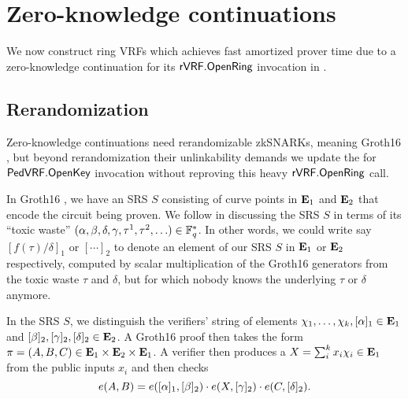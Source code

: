 
\section{Zero-knowledge continuations}
\label{sec:rvrf_cont}

We now construct ring VRFs which achieves fast amortized prover time
due to a zero-knowledge continuation for its ${\mathsf{rVRF}}.{\mathsf{OpenRing}}$
invocation in \Rring. 


\subsection{Rerandomization}

Zero-knowledge continuations need rerandomizable zkSNARKs,
meaning Groth16 \cite{Groth16}, but beyond rerandomization their
unlinkability demands we update the \openpk for ${\mathsf{PedVRF}}.{\mathsf{OpenKey}}$
invocation without reproving this heavy ${\mathsf{rVRF}}.{\mathsf{OpenRing}}$ call.

In Groth16 \cite{Groth16}, we have an SRS $S$ consisting of curve
points in ${\mathbf{E}}_1$ and ${\mathbf{E}}_2$ that encode the circuit being proven.
We follow \cite{Groth16} in discussing the SRS $S$ in terms of
its ``toxic waste''
 $(\alpha,\beta,\delta,\gamma,\tau^1,\tau^2,\ldots) \in \mathbb{F}_q^*$.
In other words, we could write say $[ f(\tau)/\delta ]_1$ or $[\cdots]_2$
to denote an element of our SRS $S$ in ${\mathbf{E}}_1$ or ${\mathbf{E}}_2$ respectively,
computed by scalar multiplication of the Groth16 generators from
the toxic waste $\tau$ and $\delta$,
 but for which nobody knows the underlying $\tau$ or $\delta$ anymore.

In the SRS $S$, we distinguish the verifiers' string of elements
 $\chi_1,\ldots,\chi_k, [\alpha]_1 \in {\mathbf{E}}_1$ and
 $[\beta]_2, [\gamma]_2, [\delta]_2 \in {\mathbf{E}}_2$.
A Groth16 \cite{Groth16} proof then takes the form 
 $\pi = (A,B,C) \in {\mathbf{E}}_1 \times {\mathbf{E}}_2 \times {\mathbf{E}}_1$.
A verifier then produces a $X = \sum_i^k x_i \chi_i \in {\mathbf{E}}_1$ from
 the public inputs $x_i$ and then checks 
$$ e(A,B) = e([\alpha]_1, [\beta]_2) \cdot
 e(X, [\gamma]_2) \cdot e(C, [\delta]_2) . $$

